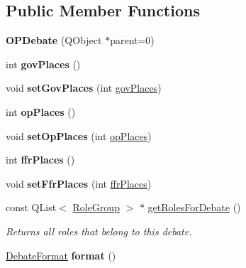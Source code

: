 \subsection*{Public Member Functions}
\begin{DoxyCompactItemize}
\item 
\hypertarget{classOPDebate_aab5adce4866e4dcb26559e48d6eda000}{{\bfseries O\-P\-Debate} (Q\-Object $\ast$parent=0)}\label{classOPDebate_aab5adce4866e4dcb26559e48d6eda000}

\item 
\hypertarget{classOPDebate_ae23419710ab432c88ff520f16eb4ac2e}{int {\bfseries gov\-Places} ()}\label{classOPDebate_ae23419710ab432c88ff520f16eb4ac2e}

\item 
\hypertarget{classOPDebate_a68438ede1c10f4c58d1126a67fff3830}{void {\bfseries set\-Gov\-Places} (int \hyperlink{classOPDebate_ab84df4cd7885bff2c1aba90cebfe2b16}{gov\-Places})}\label{classOPDebate_a68438ede1c10f4c58d1126a67fff3830}

\item 
\hypertarget{classOPDebate_a3c5dbd12883f161144a0e7949b88d29f}{int {\bfseries op\-Places} ()}\label{classOPDebate_a3c5dbd12883f161144a0e7949b88d29f}

\item 
\hypertarget{classOPDebate_a53083010036023ba32989a2f73d15f3c}{void {\bfseries set\-Op\-Places} (int \hyperlink{classOPDebate_ab957581d6e4ca6769ef88095f8245b70}{op\-Places})}\label{classOPDebate_a53083010036023ba32989a2f73d15f3c}

\item 
\hypertarget{classOPDebate_a175d53a41790796ccf213ba12bce2a92}{int {\bfseries ffr\-Places} ()}\label{classOPDebate_a175d53a41790796ccf213ba12bce2a92}

\item 
\hypertarget{classOPDebate_a0fb3598f3bced7ece35b776ed803bad4}{void {\bfseries set\-Ffr\-Places} (int \hyperlink{classOPDebate_a9c1bc648302a8c503fc8cc4893a1ac26}{ffr\-Places})}\label{classOPDebate_a0fb3598f3bced7ece35b776ed803bad4}

\item 
\hypertarget{classOPDebate_a770a195089587e670ec9b705ea26e86a}{const Q\-List$<$ \hyperlink{classDebate_ae9871a36a2f3de7a7da8922d70fbece4}{Role\-Group} $>$ $\ast$ \hyperlink{classOPDebate_a770a195089587e670ec9b705ea26e86a}{get\-Roles\-For\-Debate} ()}\label{classOPDebate_a770a195089587e670ec9b705ea26e86a}

\begin{DoxyCompactList}\small\item\em Returns all roles that belong to this debate. \end{DoxyCompactList}\item 
\hypertarget{classOPDebate_a6bf6a7dcb35ed62f5289696259c5fcdd}{\hyperlink{classDebate_a537fac343de1edd412012e4180b52e04}{Debate\-Format} {\bfseries format} ()}\label{classOPDebate_a6bf6a7dcb35ed62f5289696259c5fcdd}


\end{DoxyCompactItemize}

